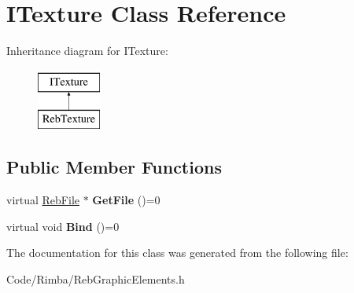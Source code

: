 \hypertarget{class_i_texture}{}\section{I\+Texture Class Reference}
\label{class_i_texture}
Inheritance diagram for I\+Texture\+:\begin{figure}[H]
\begin{center}
\leavevmode
\includegraphics[height=2.000000cm]{class_i_texture}
\end{center}
\end{figure}
\subsection*{Public Member Functions}
\begin{DoxyCompactItemize}
\item 
virtual \hyperlink{class_reb_file}{Reb\+File} $\ast$ {\bfseries Get\+File} ()=0\hypertarget{class_i_texture_a0e385878f3625e9e8a8144eb3f6ae08e}{}\label{class_i_texture_a0e385878f3625e9e8a8144eb3f6ae08e}

\item 
virtual void {\bfseries Bind} ()=0\hypertarget{class_i_texture_ac25f84578ea49ae8e56cc7c98606740f}{}\label{class_i_texture_ac25f84578ea49ae8e56cc7c98606740f}

\end{DoxyCompactItemize}


The documentation for this class was generated from the following file\+:\begin{DoxyCompactItemize}
\item 
Code/\+Rimba/Reb\+Graphic\+Elements.\+h\end{DoxyCompactItemize}
